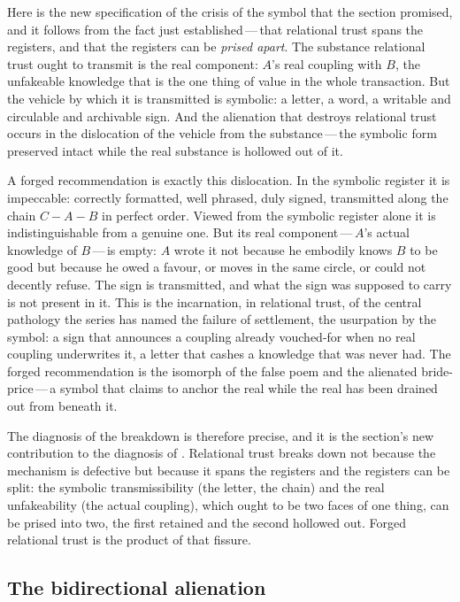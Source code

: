 Here is the new specification of the crisis of the symbol that the section promised, and it follows from the fact just established\,---\,that relational trust spans the registers, and that the registers can be \emph{prised apart}. The substance relational trust ought to transmit is the real component: $A$'s real coupling with $B$, the unfakeable knowledge that is the one thing of value in the whole transaction. But the vehicle by which it is transmitted is symbolic: a letter, a word, a writable and circulable and archivable sign. And the alienation that destroys relational trust occurs in the dislocation of the vehicle from the substance\,---\,the symbolic form preserved intact while the real substance is hollowed out of it.

A forged recommendation is exactly this dislocation. In the symbolic register it is impeccable: correctly formatted, well phrased, duly signed, transmitted along the chain $C\!-\!A\!-\!B$ in perfect order. Viewed from the symbolic register alone it is indistinguishable from a genuine one. But its real component\,---\,$A$'s actual knowledge of $B$\,---\,is empty: $A$ wrote it not because he embodily knows $B$ to be good but because he owed a favour, or moves in the same circle, or could not decently refuse. The sign is transmitted, and what the sign was supposed to carry is not present in it. This is the incarnation, in relational trust, of the central pathology the series has named the failure of settlement, the usurpation by the symbol: a sign that announces a coupling already vouched-for when no real coupling underwrites it, a letter that cashes a knowledge that was never had. The forged recommendation is the isomorph of the false poem and the alienated bride-price\,---\,a symbol that claims to anchor the real while the real has been drained out from beneath it.

The diagnosis of the breakdown is therefore precise, and it is the section's new contribution to the diagnosis of . Relational trust breaks down not because the mechanism is defective but because it spans the registers and the registers can be split: the symbolic transmissibility (the letter, the chain) and the real unfakeability (the actual coupling), which ought to be two faces of one thing, can be prised into two, the first retained and the second hollowed out. Forged relational trust is the product of that fissure.

\subsection{The bidirectional alienation}
\label{p13:sub:rel-bidirectional}

